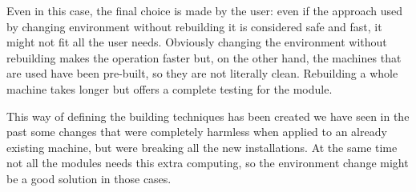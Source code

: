 \begin{itemize}
Even in this case, the final choice is made by the user: even if the
approach used by changing environment without rebuilding it is considered
safe and fast, it might not fit all the user needs. Obviously changing the
environment without rebuilding makes the operation faster but, on the
other hand, the machines that are used have been pre-built, so they are
not literally clean. Rebuilding a whole machine takes longer but offers
a complete testing for the module.

This way of defining the building techniques has been created we have seen
in the past some changes that were completely harmless when applied to an
already existing machine, but were breaking all the new installations. At
the same time not all the modules needs this extra computing, so the
environment change might be a good solution in those cases.

\end{itemize}
